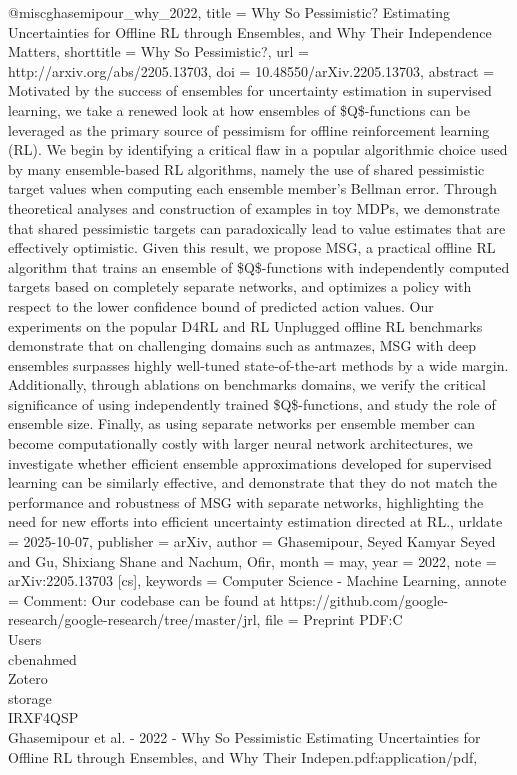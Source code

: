 @misc{ghasemipour_why_2022,
	title = {Why {So} {Pessimistic}? {Estimating} {Uncertainties} for {Offline} {RL} through {Ensembles}, and {Why} {Their} 
{Independence} {Matters}},
	shorttitle = {Why {So} {Pessimistic}?},
	url = {http://arxiv.org/abs/2205.13703},
	doi = {10.48550/arXiv.2205.13703},
	abstract = {Motivated by the success of ensembles for uncertainty estimation in supervised learning, we take a renewed 
look at how ensembles of \$Q\$-functions can be leveraged as the primary source of pessimism for offline reinforcement learning 
(RL). We begin by identifying a critical flaw in a popular algorithmic choice used by many ensemble-based RL algorithms, namely 
the use of shared pessimistic target values when computing each ensemble member's Bellman error. Through theoretical analyses 
and construction of examples in toy MDPs, we demonstrate that shared pessimistic targets can paradoxically lead to value 
estimates that are effectively optimistic. Given this result, we propose MSG, a practical offline RL algorithm that trains an 
ensemble of \$Q\$-functions with independently computed targets based on completely separate networks, and optimizes a policy 
with respect to the lower confidence bound of predicted action values. Our experiments on the popular D4RL and RL Unplugged 
offline RL benchmarks demonstrate that on challenging domains such as antmazes, MSG with deep ensembles surpasses highly 
well-tuned state-of-the-art methods by a wide margin. Additionally, through ablations on benchmarks domains, we verify the 
critical significance of using independently trained \$Q\$-functions, and study the role of ensemble size. Finally, as using 
separate networks per ensemble member can become computationally costly with larger neural network architectures, we investigate 
whether efficient ensemble approximations developed for supervised learning can be similarly effective, and demonstrate that 
they do not match the performance and robustness of MSG with separate networks, highlighting the need for new efforts into 
efficient uncertainty estimation directed at RL.},
	urldate = {2025-10-07},
	publisher = {arXiv},
	author = {Ghasemipour, Seyed Kamyar Seyed and Gu, Shixiang Shane and Nachum, Ofir},
	month = may,
	year = {2022},
	note = {arXiv:2205.13703 [cs]},
	keywords = {Computer Science - Machine Learning},
	annote = {Comment: Our codebase can be found at https://github.com/google-research/google-research/tree/master/jrl},
	file = {Preprint PDF:C\:\\Users\\cbenahmed\\Zotero\\storage\\IRXF4QSP\\Ghasemipour et al. - 2022 - Why So Pessimistic 
Estimating Uncertainties for Offline RL through Ensembles, and Why Their Indepen.pdf:application/pdf},
}

